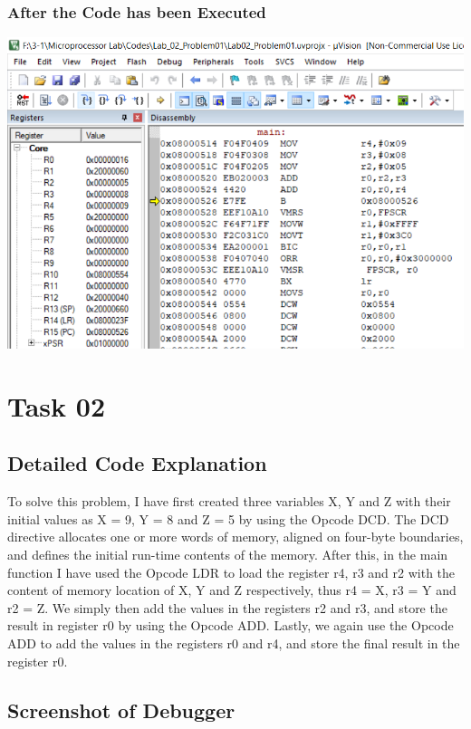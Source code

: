 \documentclass{article}
\begin{document}
\subsubsection{After the Code has been Executed}
\begin{center}
    \includegraphics[width=1.1\textwidth]{problem01_02.png}
\end{center}

\section{Task 02}

\subsection{Detailed Code Explanation}

To solve this problem, I have first created three variables X, Y and Z with their initial values as X = 9, Y = 8 and Z = 5 by using the Opcode DCD. The DCD directive allocates one or more words of memory, aligned on four-byte boundaries, and defines the initial run-time contents of the memory. After this, in the main function I have used the Opcode LDR to load the register r4, r3 and r2 with the content of memory location of X, Y and Z respectively, thus r4 = X, r3 = Y and r2 = Z. We simply then add the values in the registers r2 and r3, and store the result in register r0 by using the Opcode ADD. Lastly, we again use the Opcode ADD to add the values in the registers r0 and r4, and store the final result in the register r0.

\subsection{Screenshot of Debugger}
\end{document}
